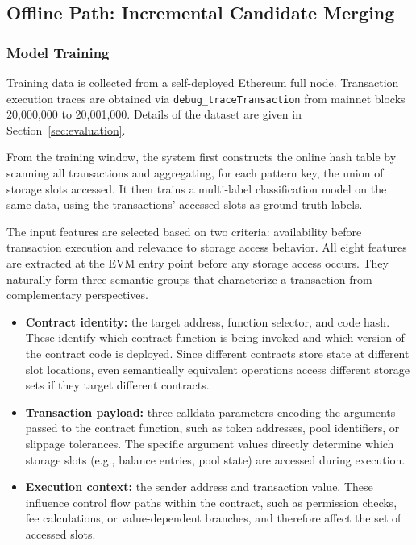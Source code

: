 \documentclass[conference]{IEEEtran}
\begin{document}
\subsection{Offline Path: Incremental Candidate Merging}
\label{sec:offline-path}

\subsubsection{Model Training}
\label{sec:model-training}

Training data is collected from a self-deployed Ethereum full node.
Transaction execution traces are obtained via \texttt{debug\_traceTransaction} from mainnet blocks 20,000,000 to 20,001,000.
Details of the dataset are given in Section~\ref{sec:evaluation}.

From the training window, the system first constructs the online hash table by scanning all transactions and aggregating, for each pattern key, the union of storage slots accessed. It then trains a multi-label classification model on the same data, using the transactions' accessed slots as ground-truth labels.

The input features are selected based on two criteria: availability before transaction execution and relevance to storage access behavior. All eight features are extracted at the EVM entry point before any storage access occurs. They naturally form three semantic groups that characterize a transaction from complementary perspectives.

\begin{itemize}
    \item \textbf{Contract identity:} the target address, function selector, and code hash. These identify which contract function is being invoked and which version of the contract code is deployed. Since different contracts store state at different slot locations, even semantically equivalent operations access different storage sets if they target different contracts.
    \item \textbf{Transaction payload:} three calldata parameters encoding the arguments passed to the contract function, such as token addresses, pool identifiers, or slippage tolerances. The specific argument values directly determine which storage slots (e.g., balance entries, pool state) are accessed during execution.
    \item \textbf{Execution context:} the sender address and transaction value. These influence control flow paths within the contract, such as permission checks, fee calculations, or value-dependent branches, and therefore affect the set of accessed slots.
\end{itemize}
\end{document}
